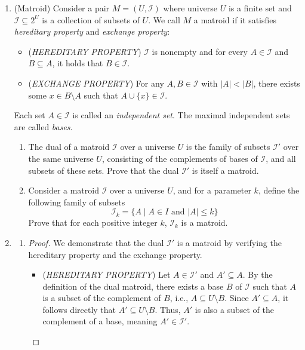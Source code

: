 \documentclass[12pt,a4paper]{article}
\makeatletter
\newtheorem*{solution}{Solution}
\theoremstyle{definition}
\renewenvironment{solution}[1][Solution]
{\par\pushQED{\qed}\normalfont\topsep6\p@\@plus6\p@\relax\trivlist
\item[\hskip\labelsep\bfseries#1\@addpunct{.}]\ignorespaces}{\popQED\endtrivlist\@endpefalse}
\makeatother
\begin{document}
\begin{enumerate}
  \item {\color{purple} (Matroid)} Consider a pair $M = (U, \mathcal{I})$ where universe $U$ is a finite set and $\mathcal{I}
    \subseteq 2^U$ is a collection of subsets of $U$. We call $M$ a
    matroid if it satisfies \emph{hereditary property} and
    \emph{exchange property}:
    \begin{itemize}
      \item (\emph{HEREDITARY PROPERTY}) $\mathcal{I}$ is nonempty
        and for every $A \in \mathcal{I}$ and $B \subseteq A$, it
        holds that $B \in \mathcal{I}$.
      \item (\emph{EXCHANGE PROPERTY}) For any $A, B \in
        \mathcal{I}$ with $|A| < |B|$, there
        exists some $x \in B \setminus A$ such that $A \cup \{x\} \in
        \mathcal{I}$.
    \end{itemize}
    Each set $A \in \mathcal{I}$ is called an \emph{independent set}. The maximal independent sets are called \emph{bases}.
    \begin{enumerate}
      \item The dual of a matroid $\mathcal{I}$ over a universe $U$ is the family of subsets $\mathcal{I}'$ over the same universe $U$, consisting of the complements of bases of $\mathcal{I}$, and all subsets of these sets. Prove that the dual $\mathcal{I}'$ is itself a matroid.
      \item Consider a matroid $\mathcal{I}$ over a universe $U$, and for a parameter $k$, define the following family of subsets 
      \[
          \mathcal{I}_k = \{A \mid A \in I \,\, \text{and} \,\, |A| \leq k\}
      \]
      Prove that for each positive integer $k$, $\mathcal{I}_k$ is a matroid.
    \end{enumerate}

    \begin{solution}
        \begin{enumerate}
    
            \item 
            \begin{proof}
We demonstrate that the dual $\mathcal{I}'$ is a matroid by verifying the hereditary property and the exchange property.

    \begin{itemize}
        \item (\emph{HEREDITARY PROPERTY})
        Let $A \in \mathcal{I}'$ and $A' \subseteq A$. By the definition of the dual matroid, there exists a base $B$ of $\mathcal{I}$ such that $A$ is a subset of the complement of $B$, i.e., $A \subseteq U \setminus B$. Since $A' \subseteq A$, it follows directly that $A' \subseteq U \setminus B$. Thus, $A'$ is also a subset of the complement of a base, meaning $A' \in \mathcal{I}'$.



\end{itemize}
\end{proof}
\end{enumerate}
\end{solution}
\end{enumerate}
\end{document}

